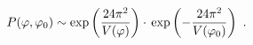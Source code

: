 \begin{equation}\label{E38a}
P(\varphi,\varphi_0) \sim  
\exp\left({24\pi^2\over V(\varphi)}\right)\cdot\, \exp\left(-{24\pi^2\over 
V(\varphi_0)}\right) \ .
\end{equation}


